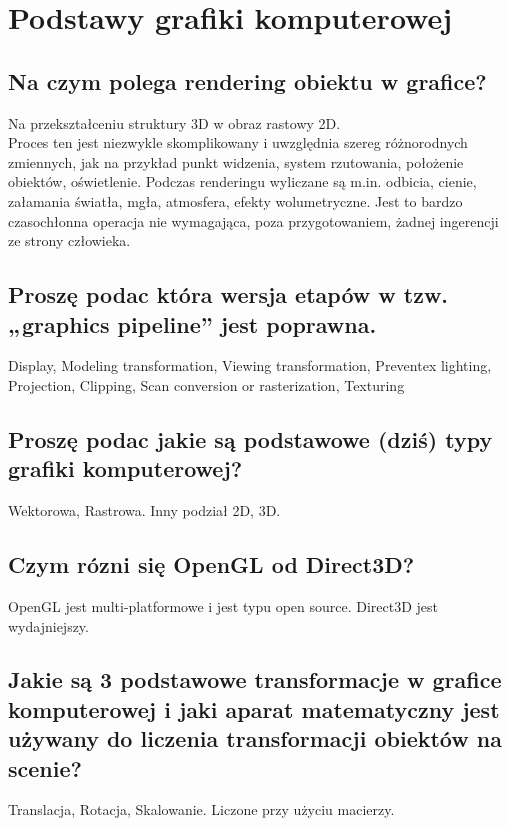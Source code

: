 \chapter{Podstawy grafiki komputerowej}
\PartialToc
\section{Na czym polega rendering obiektu w grafice?}
Na przekształceniu struktury 3D w obraz rastowy 2D. \\
Proces ten jest niezwykle skomplikowany i uwzględnia szereg różnorodnych zmiennych, jak na przykład punkt widzenia, system rzutowania, położenie obiektów, oświetlenie. Podczas renderingu wyliczane są m.in. odbicia, cienie, załamania światła, mgła, atmosfera, efekty wolumetryczne. Jest to bardzo czasochłonna operacja nie wymagająca, poza przygotowaniem, żadnej ingerencji ze strony człowieka.

\section{Proszę podac która wersja etapów w tzw. „graphics pipeline” jest poprawna.}
Display, Modeling transformation, Viewing transformation, Preventex lighting, Projection, Clipping, Scan conversion or rasterization, Texturing

\section{Proszę podac jakie są podstawowe (dziś) typy grafiki komputerowej?}
Wektorowa, Rastrowa. Inny podział 2D, 3D.

\section{Czym rózni się OpenGL od Direct3D? }
OpenGL jest multi-platformowe i jest typu open source. Direct3D jest wydajniejszy.

\section{Jakie są 3 podstawowe transformacje w grafice komputerowej i jaki aparat matematyczny jest używany do liczenia transformacji obiektów na scenie?}
Translacja, Rotacja, Skalowanie. Liczone przy użyciu macierzy.

